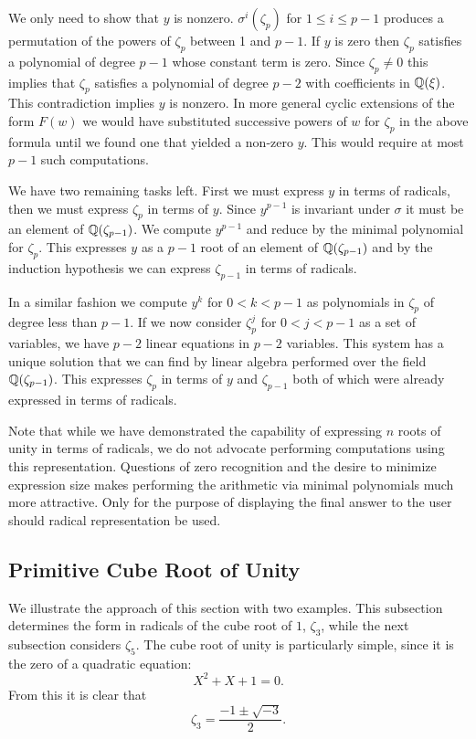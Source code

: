 We only need to show that $y$ is nonzero. $\sigma^i(\zeta_p)$ for
$1\leq i\leq p-1$ produces a permutation of the powers of $\zeta_p$
between 1 and $p-1$.  If $y$ is zero then $\zeta_p$ satisfies a
polynomial of degree $p-1$ whose constant term is zero.  Since
$\zeta_p \not = 0$ this implies that $\zeta_p$ satisfies a polynomial
of degree $p-2$ with coefficients in $\mathbb{Q}(\xi)$.  This contradiction
implies $y$ is nonzero.  In more general cyclic extensions of the form
$F(w)$ we would have substituted successive powers of $w$ for
$\zeta_p$ in the above formula until we found one that yielded a
non-zero $y$.  This would require at most $p-1$ such computations.

We have two remaining tasks left. First we must express $y$ in terms
of radicals, then we must express $\zeta_p$ in terms of $y$. Since
$y^{p-1}$ is invariant under $\sigma$ it must be an element of
$\mathbb{Q}(\zeta_{p-1})$. We compute $y^{p-1}$ and reduce by the minimal
polynomial for $\zeta_p$. This expresses $y$ as a $p-1${\th} root of
an element of $\mathbb{Q}(\zeta_{p-1})$ and by the induction hypothesis we can
express $\zeta_{p-1}$ in terms of radicals.

In a similar fashion we compute $y^k$ for $0<k<p-1$ as polynomials in
$\zeta_p$ of degree less than $p-1$.  If we now consider $\zeta_p^j$
for $0<j<p-1$ as a set of variables, we have $p-2$ linear equations in
$p-2$ variables.  This system has a unique solution that we can find
by linear algebra performed over the field $\mathbb{Q}(\zeta_{p-1})$.  This
expresses $\zeta_p$ in terms of $y$ and $\zeta_{p-1}$ both of which
were already expressed in terms of radicals.

Note that while we have demonstrated the capability of expressing
$n${\th} roots of unity in terms of radicals, we do not advocate
performing computations using this representation.  Questions of zero
recognition and the desire to minimize expression size makes
performing the arithmetic via minimal polynomials much more
attractive.  Only for the purpose of displaying the final answer to
the user should radical representation be used.

\subsection{Primitive Cube Root of Unity}
We illustrate the approach of this section with two examples.  This
subsection determines the form in radicals of the cube root of $1$,
$\zeta_3$, while the next subsection considers $\zeta_5$.  The cube
root of unity is particularly simple, since it is the zero of a
quadratic equation:
\[
X^2 + X + 1 =0.
\]
From this it is clear that 
\[
\zeta_3 = \frac{-1 \pm \sqrt{-3}}{2}.
\]

